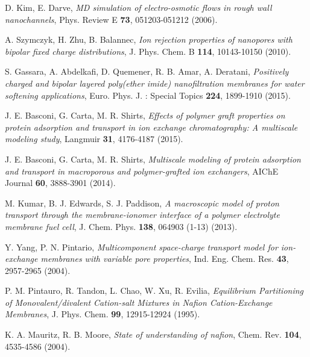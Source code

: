 \documentclass[3p,english,preprint]{elsarticle}
\begin{document}
\begin{thebibliography}{00}
D. Kim, E. Darve, 
{\it MD simulation of electro-osmotic flows in rough wall nanochannels},
Phys. Review E {\bf 73}, 051203-051212 (2006).







 A. Szymczyk,  H.  Zhu,  B. Balannec, 
{\it Ion rejection properties of nanopores with bipolar fixed charge distributions},
 J. Phys. Chem. B {\bf 114}, 10143-10150 (2010).


S. Gassara, A. Abdelkafi, D. Quemener, R. B.  Amar, A.  Deratani,
{\it Positively charged and bipolar layered poly(ether imide) nanofiltration membranes 
for water softening applications}, 
 Euro. Phys. J. : Special Topics {\bf 224}, 1899-1910 (2015). 



 J. E. Basconi, G. Carta,  M. R.  Shirts,
{\it Effects of polymer graft properties on protein adsorption and transport in 
ion exchange chromatography: A multiscale modeling study}, 
 Langmuir {\bf 31}, 4176-4187 (2015). 

 J. E. Basconi, G. Carta,  M. R.  Shirts,
{\it Multiscale modeling of protein adsorption and transport in macroporous and 
polymer-grafted ion exchangers}, 
 AIChE Journal {\bf 60},  3888-3901 (2014). 




M. Kumar, B. J. Edwards,  S. J. Paddison,
{\it A macroscopic model of proton transport through the 
membrane-ionomer interface of a polymer electrolyte membrane fuel cell},
J. Chem. Phys.  {\bf 138},  064903 (1-13) (2013).




Y. Yang, P. N. Pintario, 
{\it Multicomponent space-charge transport model for ion-exchange membranes
with variable pore properties},
Ind. Eng. Chem. Res.  {\bf 43},  2957-2965 (2004).


P. M. Pintauro, R. Tandon, L. Chao, W. Xu, R. Evilia, 
{\it  Equilibrium
Partitioning of Monovalent/divalent Cation-salt Mixtures in Nafion
Cation-Exchange Membranes}, 
  J. Phys. Chem.  {\bf 99}, 12915-12924 (1995).




K. A. Mauritz, R. B. Moore,
{\it State of understanding of nafion}, 
Chem. Rev. {\bf 104}, 4535-4586 (2004).


\end{thebibliography}
\end{document}
